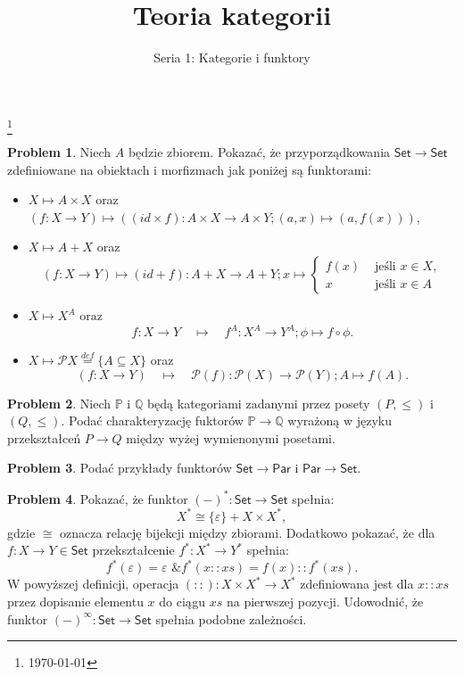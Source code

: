 \documentclass[10pt]{amsart}
\title{Teoria kategorii}
\author{Seria 1: Kategorie i funktory}
\theoremstyle{plain}
\theoremstyle{definition}
\newtheorem{problem}{Problem}
\numberwithin{equation}{section}
\newcommand\blfootnote[1]{%
  \begingroup
  \renewcommand\thefootnote{}\footnote{#1}%
  \addtocounter{footnote}{-1}%
  \endgroup
}
\begin{document}
\maketitle

\blfootnote{\today}


\begin{problem}
Niech $A$ będzie zbiorem. Pokazać, że przyporządkowania $\mathsf{Set}\to \mathsf{Set}$ zdefiniowane na obiektach i morfizmach jak poniżej są funktorami:
\begin{itemize}
\item $X\mapsto A\times X$ oraz $(f:X\to Y)\mapsto \left ((id \times f):A\times X\to A\times Y; (a,x)\mapsto (a,f(x))\right )$,
\item $X\mapsto A+ X$ oraz $$(f:X\to Y)\mapsto (id + f):A+ X\to A+ Y; x \mapsto \left \{ \begin{array}{cc}f(x)  &\text{ jeśli }x\in X, \\ x &\text{ jeśli }x\in A \end{array}\right. $$
\item $X\mapsto X^A$ oraz 
$$
f:X\to Y\quad \mapsto \quad f^A:X^A\to Y^A; \phi\mapsto f\circ \phi. 
$$
\item $X\mapsto \mathcal{P}X\stackrel{def}{=} \{ A\subseteq X \}$ oraz 
$$
(f:X\to Y)\quad \mapsto \quad \mathcal{P}(f):\mathcal{P}(X)\to \mathcal{P}(Y); A\mapsto f(A). 
$$
\end{itemize}
\end{problem}
%
\begin{problem}
Niech $\mathbb{P}$ i $\mathbb{Q}$ będą kategoriami zadanymi przez posety $(P,\leq)$ i $(Q,\leq)$. Podać charakteryzację fuktorów $\mathbb{P}\to \mathbb{Q}$ wyrażoną w języku przekształceń $P\to Q$ między wyżej wymienonymi posetami.
\end{problem}

\begin{problem}
Podać przykłady funktorów $\mathsf{Set}\to \mathsf{Par}$ i $\mathsf{Par}\to \mathsf{Set}$. 
\end{problem}

\begin{problem}
Pokazać, że funktor $(-)^\ast: \mathsf{Set}\to \mathsf{Set}$ spełnia:
$$
X^\ast \cong \{ \varepsilon \} + X\times X^\ast,
$$
gdzie $\cong$ oznacza relację bijekcji między zbiorami. Dodatkowo pokazać, że dla $f:X\to Y\in \mathsf{Set}$
przekształcenie $f^\ast: X^\ast \to Y^\ast$ spełnia:
$$
f^\ast (\varepsilon) = \varepsilon \text{ \& } f^\ast (x :: xs) = f(x) :: f^\ast (xs).
$$
W powyższej definicji, operacja $ (::) : X\times X^\ast \to X^\ast$ zdefiniowana jest dla $x :: xs$ przez dopisanie elementu $x$ do ciągu $xs$ na pierwszej pozycji. Udowodnić, że funktor $(-)^\infty : \mathsf{Set}\to \mathsf{Set}$ spełnia podobne zależności.
\end{problem}
\end{document}
